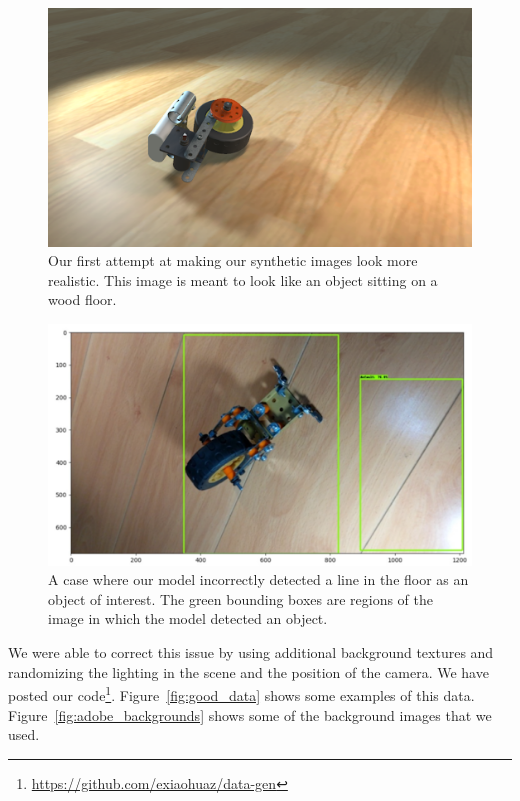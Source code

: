 \begin{figure}
  \includegraphics[width=\columnwidth]{figures/synthetic/wood_floor.png}
  \caption{
    Our first attempt at making our synthetic images look more realistic.
    This image is meant to look like an object sitting on a wood floor.
  }\label{fig:wood_floor}
\end{figure}

\begin{figure}
  \includegraphics[width=\columnwidth]{figures/synthetic/false_positive.png}
  \caption{
    A case where our model incorrectly detected a line in the floor as an
    object of interest.
    The green bounding boxes are regions of the image in which the model
    detected an object.
  }\label{fig:false_positive}
\end{figure}

We were able to correct this issue by using additional background textures and
randomizing the lighting in the scene and the position of the camera.
We have posted our code\footnote{\url{https://github.com/exiaohuaz/data-gen}}.
Figure~\ref{fig:good_data} shows some examples of this data.
Figure~\ref{fig:adobe_backgrounds} shows some of the background images that we
used.


